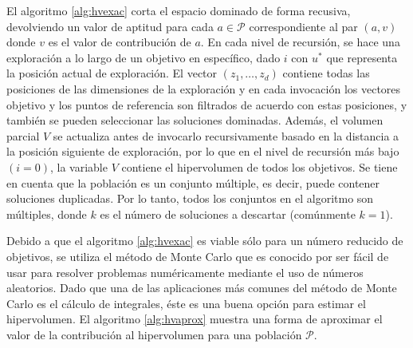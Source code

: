 El algoritmo \ref{alg:hvexac} corta el espacio dominado de forma recusiva, devolviendo un valor de 
aptitud para cada $a \in \mathcal{P}$ correspondiente al par $\left(a, v\right)$ donde $v$ es el valor de contribuci\'on de $a$. 
En cada nivel de recursi\'on, se hace una exploraci\'on a lo largo de un objetivo en espec\'ifico, dado $i$ con $u^{*}$ que 
representa la posici\'on actual de exploraci\'on. El vector $\left(z_1,\ldots, z_d \right)$ contiene todas las posiciones de las 
dimensiones de la exploraci\'on y en cada invocaci\'on los vectores objetivo y los puntos de referencia son filtrados de acuerdo 
con estas posiciones, y tambi\'en se pueden seleccionar las soluciones dominadas. Adem\'as, el volumen parcial $V$ se actualiza 
antes de invocarlo recursivamente basado en la distancia a la posici\'on siguiente de exploraci\'on, por lo que en el nivel de 
recursi\'on m\'as bajo $\left(i = 0\right)$, la variable $V$ contiene el hipervolumen de todos los objetivos. Se tiene en cuenta que 
la poblaci\'on es un conjunto m\'ultiple, es decir, puede contener soluciones duplicadas. Por lo tanto, todos los 
conjuntos en el algoritmo son m\'ultiples, donde $k$ es el n\'umero de soluciones a descartar (com\'unmente $k=1$).

Debido a que el algoritmo \ref{alg:hvexac} es viable s\'olo para un n\'umero reducido de objetivos, se utiliza el m\'etodo de Monte 
Carlo que es conocido por ser f\'acil de usar para resolver problemas num\'ericamente mediante el uso de n\'umeros aleatorios. Dado 
que una de las aplicaciones m\'as comunes del m\'etodo de Monte Carlo es el c\'alculo de integrales, \'este es una 
buena opci\'on para estimar el hipervolumen. El algoritmo \ref{alg:hvaprox} muestra una forma de aproximar el 
valor de la contribuci\'on al hipervolumen para una poblaci\'on $\mathcal{P}$.

